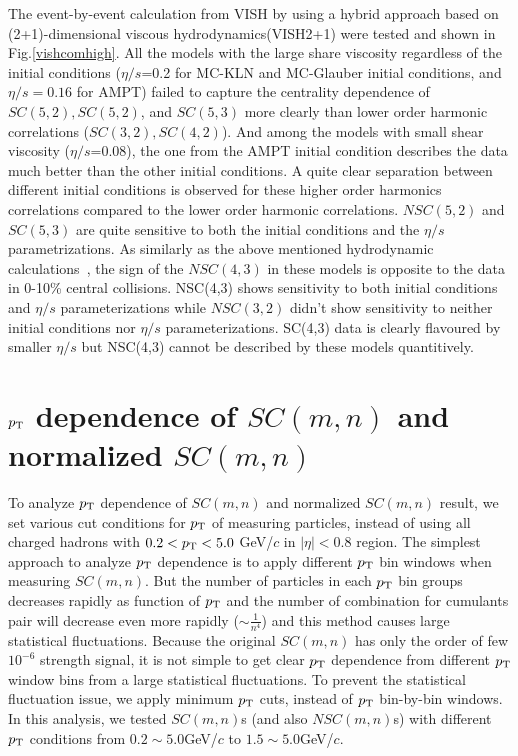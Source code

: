   The event-by-event calculation from VISH by using a hybrid approach based on (2+1)-dimensional viscous hydrodynamics(VISH2+1) were tested and shown in Fig.\ref{vishcomhigh}. All the models with the large share viscosity regardless of the initial conditions ($\eta/s$=0.2 for MC-KLN and MC-Glauber initial conditions, and $\eta/s = 0.16$ for AMPT) failed to capture the centrality dependence of $SC(5,2), SC(5,2)$, and $SC(5,3)$ more clearly than lower order harmonic correlations ($SC(3,2), SC(4,2)$).
And among the models with small shear viscosity ($\eta/s$=0.08), the one from the AMPT initial condition describes the data much better than the other initial conditions. 
A quite clear separation between different initial conditions is observed for these higher order harmonics correlations compared to the lower order harmonic correlations.
$NSC(5,2)$ and $SC(5,3)$ are quite sensitive to both the initial conditions and the $\eta/s$ parametrizations.
As similarly as the above mentioned hydrodynamic calculations~\cite{Niemi:2015qia}, the sign of the $NSC(4,3)$ in these models is opposite to the data in 0-10\% central collisions. NSC(4,3) shows sensitivity to both initial conditions and $\eta/s$ parameterizations while $NSC(3,2)$ didn't show sensitivity to neither initial conditions nor $\eta/s$ parameterizations.
SC(4,3) data is clearly flavoured by smaller $\eta/s$ but NSC(4,3) cannot be described by these models quantitively.






\section{$p_{\rm{T}}$ dependence of $SC(m,n)$ and normalized $SC(m,n)$}

To analyze $p_{\rm{T}}$ dependence of $SC(m,n)$ and normalized $SC(m,n)$ result, we set various cut conditions for $p_{\rm{T}}$ of measuring particles, instead of using all charged hadrons with $0.2 < p_{\rm{T}} < 5.0$ GeV/$c$ in $|\eta|<0.8$ region. The simplest approach to analyze $p_{\rm{T}}$ dependence is to apply different $p_{\rm{T}}$ bin windows when measuring $SC(m,n)$. But the number of particles in each $p_{\rm{T}}$ bin groups decreases rapidly as function of $p_{\rm{T}}$ and the number of combination for cumulants pair will decrease even more rapidly ($ \sim\frac{1}{n^4}$) and this method causes large statistical fluctuations. Because the original $SC(m,n)$ has only the order of few $10^{-6}$ strength signal, it is not simple to get clear $p_{\rm{T}}$ dependence from different $p_{\rm{T}}$ window bins from a large statistical fluctuations. To prevent the statistical fluctuation issue, we apply minimum $p_{\rm{T}}$ cuts, instead of $p_{\rm{T}}$ bin-by-bin windows. In this analysis, we tested $SC(m,n)$s (and also $NSC(m,n)$s) with different $p_{\rm{T}}$ conditions from $0.2 \sim 5.0$GeV/$c$ to $1.5 \sim 5.0$GeV/$c$. 


